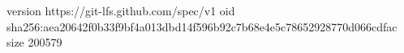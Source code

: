 version https://git-lfs.github.com/spec/v1
oid sha256:aea20642f0b33f9bf4a013dbd14f596b92c7b68e4e5c78652928770d066cdfac
size 200579
